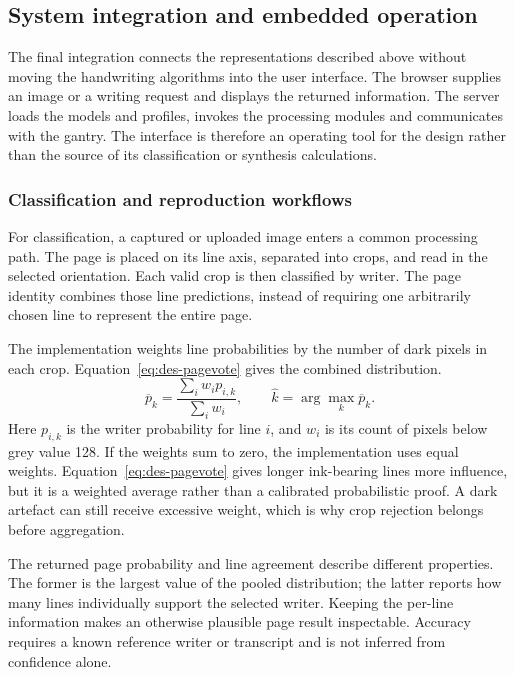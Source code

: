 \subsection{System integration and embedded operation}
\label{sec:des-integration}
The final integration connects the representations described above without moving the handwriting algorithms into the user interface. The browser supplies an image or a writing request and displays the returned information. The server loads the models and profiles, invokes the processing modules and communicates with the gantry. The interface is therefore an operating tool for the design rather than the source of its classification or synthesis calculations.

\subsubsection{Classification and reproduction workflows}
For classification, a captured or uploaded image enters a common processing path. The page is placed on its line axis, separated into crops, and read in the selected orientation. Each valid crop is then classified by writer. The page identity combines those line predictions, instead of requiring one arbitrarily chosen line to represent the entire page.

The implementation weights line probabilities by the number of dark pixels in each crop. Equation~\ref{eq:des-pagevote} gives the combined distribution.
\begin{equation}
\overline p_k=\frac{\sum_i w_i p_{i,k}}{\sum_i w_i},\qquad
\widehat k=\arg\max_k\overline p_k.
\label{eq:des-pagevote}
\end{equation}
Here $p_{i,k}$ is the writer probability for line $i$, and $w_i$ is its count of pixels below grey value 128. If the weights sum to zero, the implementation uses equal weights. Equation~\ref{eq:des-pagevote} gives longer ink-bearing lines more influence, but it is a weighted average rather than a calibrated probabilistic proof. A dark artefact can still receive excessive weight, which is why crop rejection belongs before aggregation.

The returned page probability and line agreement describe different properties. The former is the largest value of the pooled distribution; the latter reports how many lines individually support the selected writer. Keeping the per-line information makes an otherwise plausible page result inspectable. Accuracy requires a known reference writer or transcript and is not inferred from confidence alone.

